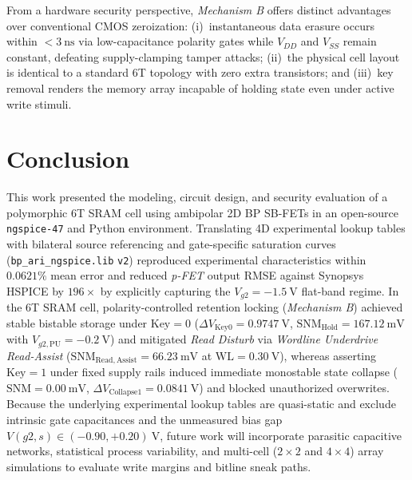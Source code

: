 \documentclass[conference]{IEEEtran}
\begin{document}
From a hardware security perspective, \textit{Mechanism B} offers distinct advantages over conventional CMOS zeroization: (i)~instantaneous data erasure occurs within $<3\ \text{ns}$ via low-capacitance polarity gates while $V_{DD}$ and $V_{SS}$ remain constant, defeating supply-clamping tamper attacks; (ii)~the physical cell layout is identical to a standard 6T topology with zero extra transistors; and (iii)~key removal renders the memory array incapable of holding state even under active write stimuli.

\section{Conclusion}
This work presented the modeling, circuit design, and security evaluation of a polymorphic 6T SRAM cell using ambipolar 2D BP SB-FETs in an open-source \texttt{ngspice-47} and Python environment. Translating 4D experimental lookup tables with bilateral source referencing and gate-specific saturation curves (\texttt{bp\_ari\_\allowbreak ngspice.lib} \texttt{v2}) reproduced experimental characteristics within $0.0621\%$ mean error and reduced \textit{p-FET} output RMSE against Synopsys HSPICE by $196\times$ by explicitly capturing the $V_{g2}=-1.5\ \text{V}$ flat-band regime. In the 6T SRAM cell, polarity-controlled retention locking (\textit{Mechanism B}) achieved stable bistable storage under $\text{Key}=0$ ($\Delta V_{\mathrm{Key0}} = 0.9747\ \text{V}$, $\mathrm{SNM}_{\mathrm{Hold}} = 167.12\ \text{mV}$ with $V_{g2,\mathrm{PU}}=-0.2\ \text{V}$) and mitigated \textit{Read Disturb} via \textit{Wordline Underdrive Read-Assist} ($\mathrm{SNM}_{\mathrm{Read,Assist}} = 66.23\ \text{mV}$ at $\mathrm{WL}=0.30\ \text{V}$), whereas asserting $\text{Key}=1$ under fixed supply rails induced immediate monostable state collapse ($\mathrm{SNM} = 0.00\ \text{mV}$, $\Delta V_{\mathrm{Collapse1}} = 0.0841\ \text{V}$) and blocked unauthorized overwrites. Because the underlying experimental lookup tables are quasi-static and exclude intrinsic gate capacitances and the unmeasured bias gap $V(g2,s) \in (-0.90, +0.20)\ \text{V}$, future work will incorporate parasitic capacitive networks, statistical process variability, and multi-cell ($2\times 2$ and $4\times 4$) array simulations to evaluate write margins and bitline sneak paths.



\end{document}
